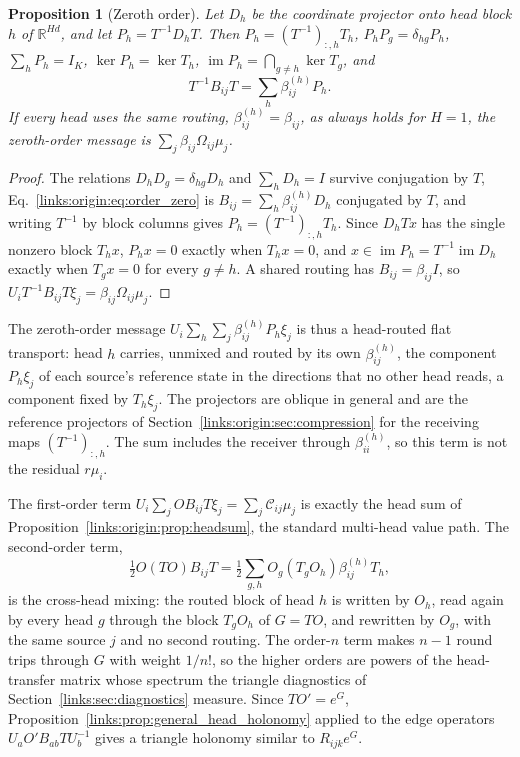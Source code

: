 \documentclass[11pt]{article}
\newtheorem{proposition}[theorem]{Proposition}
\theoremstyle{definition}
\theoremstyle{remark}
\providecommand{\im}{\operatorname{im}}
\begin{document}
\begin{proposition}[Zeroth order]
\label{links:origin:prop:order_zero}
Let $D_h$ be the coordinate projector onto head block $h$ of $\mathbb R^{Hd}$, and let $P_h=T^{-1}D_hT$. Then $P_h=(T^{-1})_{:,h}T_h$, $P_hP_g=\delta_{hg}P_h$, $\sum_hP_h=I_K$, $\ker P_h=\ker T_h$, $\im P_h=\bigcap_{g\ne h}\ker T_g$, and
\begin{equation}
T^{-1}B_{ij}T=\sum_h\beta_{ij}^{(h)}P_h.
\label{links:origin:eq:order_zero}
\end{equation}
If every head uses the same routing, $\beta_{ij}^{(h)}=\beta_{ij}$, as always holds for $H=1$, the zeroth-order message is $\sum_j\beta_{ij}\Omega_{ij}\mu_j$.
\end{proposition}

\begin{proof}
The relations $D_hD_g=\delta_{hg}D_h$ and $\sum_hD_h=I$ survive conjugation by $T$, Eq.~\eqref{links:origin:eq:order_zero} is $B_{ij}=\sum_h\beta_{ij}^{(h)}D_h$ conjugated by $T$, and writing $T^{-1}$ by block columns gives $P_h=(T^{-1})_{:,h}T_h$. Since $D_hTx$ has the single nonzero block $T_hx$, $P_hx=0$ exactly when $T_hx=0$, and $x\in\im P_h=T^{-1}\im D_h$ exactly when $T_gx=0$ for every $g\ne h$. A shared routing has $B_{ij}=\beta_{ij}I$, so $U_iT^{-1}B_{ij}T\xi_j=\beta_{ij}\Omega_{ij}\mu_j$.
\end{proof}

The zeroth-order message $U_i\sum_h\sum_j\beta_{ij}^{(h)}P_h\xi_j$ is thus a head-routed flat transport: head $h$ carries, unmixed and routed by its own $\beta_{ij}^{(h)}$, the component $P_h\xi_j$ of each source's reference state in the directions that no other head reads, a component fixed by $T_h\xi_j$. The projectors are oblique in general and are the reference projectors of Section~\ref{links:origin:sec:compression} for the receiving maps $(T^{-1})_{:,h}$. The sum includes the receiver through $\beta_{ii}^{(h)}$, so this term is not the residual $r\mu_i$.

The first-order term $U_i\sum_jOB_{ij}T\xi_j=\sum_j\mathcal C_{ij}\mu_j$ is exactly the head sum of Proposition~\ref{links:origin:prop:headsum}, the standard multi-head value path. The second-order term,
\begin{equation}
\tfrac12O(TO)B_{ij}T=\tfrac12\sum_{g,h}O_g(T_gO_h)\beta_{ij}^{(h)}T_h,
\label{links:origin:eq:order_two}
\end{equation}
is the cross-head mixing: the routed block of head $h$ is written by $O_h$, read again by every head $g$ through the block $T_gO_h$ of $G=TO$, and rewritten by $O_g$, with the same source $j$ and no second routing. The order-$n$ term makes $n-1$ round trips through $G$ with weight $1/n!$, so the higher orders are powers of the head-transfer matrix whose spectrum the triangle diagnostics of Section~\ref{links:sec:diagnostics} measure. Since $TO'=e^{G}$, Proposition~\ref{links:prop:general_head_holonomy} applied to the edge operators $U_aO'B_{ab}TU_b^{-1}$ gives a triangle holonomy similar to $R_{ijk}e^{G}$.
\end{document}
